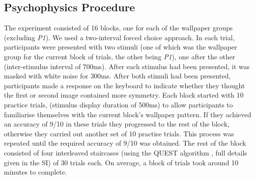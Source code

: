 \documentclass[11pt, twoside]{article}
\begin{document}
\subsection*{Psychophysics Procedure}
The experiment consisted of 16 blocks, one for each of the wallpaper groups (excluding \textit{P1}). We used a two-interval forced choice approach. In each trial, participants were presented with two stimuli (one of which was the wallpaper group for the current block of trials, the other being \textit{P1}), one after the other (inter-stimulus interval of 700ms). After each stimulus had been presented, it was masked with white noise for 300ms. After both stimuli had been presented, participants made a response on the keyboard to indicate whether they thought the first or second image contained more symmetry. Each block started with 10 practice trials, (stimulus display duration of 500ms) to allow participants to familiarise themselves with the current block's wallpaper pattern. If they achieved an accuracy of 9/10 in these trials they progressed to the rest of the block, otherwise they carried out another set of 10 practise trials. This process was repeated until the required accuracy of 9/10 was obtained. The rest of the block consisted of four interleaved staircases (using the QUEST algorithm \citep{watson1983quest}, full details given in the SI) of 30 trials each. On average, a block of trials took around 10 minutes to complete. 
\end{document}
